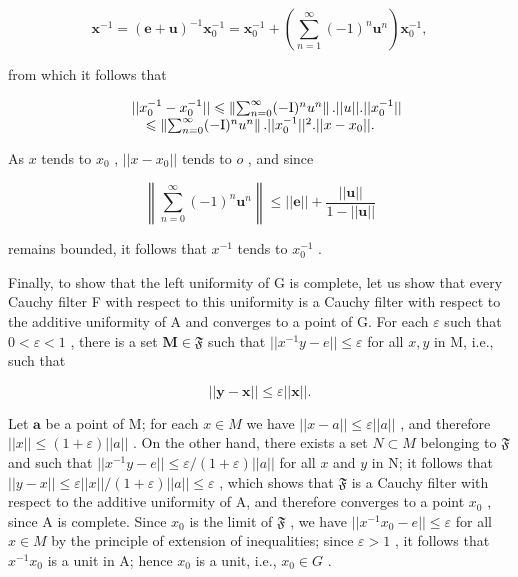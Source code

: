 \[
\boldsymbol {x} ^ {- 1} = (\boldsymbol {e} + \boldsymbol {u}) ^ {- 1} \boldsymbol {x} _ {0} ^ {- 1} = \boldsymbol {x} _ {0} ^ {- 1} + \left(\sum_ {n = 1} ^ {\infty} (- 1) ^ {n} \boldsymbol {u} ^ {n}\right) \boldsymbol {x} _ {0} ^ {- 1},\tag{9}
\]

from which it follows that

\[
\begin{array}{r l} & {| | x _ {0} ^ {- 1} - x _ {0} ^ {- 1} | | \leqslant \left\| \sum_ {n = 0} ^ {\infty} (- \mathrm{I}) ^ {n} u ^ {n} \right\|. | | u | |. | | x _ {0} ^ {- 1} | |} \\ & {\quad \leqslant \left\| \sum_ {n = 0} ^ {\infty} (- \mathrm{I}) ^ {n} u ^ {n} \right\|. | | x _ {0} ^ {- 1} | | ^ {2}. | | x - x _ {0} | |.} \end{array}
\]

As \(x\) tends to \(x_0\) , \(||x - x_0||\) tends to \(o\) , and since

\[
\left\| \sum_ {n = 0} ^ {\infty} (- 1) ^ {n} \boldsymbol {u} ^ {n} \right\| \leqslant | | \boldsymbol {e} | | + \frac {| | \boldsymbol {u} | |}{1 - | | \boldsymbol {u} | |}
\]

remains bounded, it follows that \(x^{-1}\) tends to \(x_{0}^{-1}\) .

Finally, to show that the left uniformity of G is complete, let us show that every Cauchy filter F with respect to this uniformity is a Cauchy filter with respect to the additive uniformity of A and converges to a point of G. For each \(\varepsilon\) such that \(0 < \varepsilon < 1\) , there is a set \(\mathbf{M} \in \mathfrak{F}\) such that \(||x^{-1}y - e|| \leqslant \varepsilon\) for all \(x, y\) in M, i.e., such that

\[
\left| \left| \mathbf {y} - \mathbf {x} \right| \right| \leqslant \varepsilon \left| \left| \mathbf {x} \right| \right|.
\]

Let \(\pmb{a}\) be a point of M; for each \(x \in M\) we have \(||x - a|| \leqslant \varepsilon ||a||\) , and therefore \(||x|| \leqslant (1 + \varepsilon)||a||\) . On the other hand, there exists a set \(N \subset M\) belonging to \(\mathfrak{F}\) and such that \(||x^{-1}y - e|| \leqslant \varepsilon / (1 + \varepsilon)||a||\) for all \(x\) and \(y\) in N; it follows that \(||y - x|| \leqslant \varepsilon ||x|| / (1 + \varepsilon)||a|| \leqslant \varepsilon\) , which shows that \(\mathfrak{F}\) is a Cauchy filter with respect to the additive uniformity of A, and therefore converges to a point \(x_0\) , since A is complete. Since \(x_0\) is the limit of \(\mathfrak{F}\) , we have \(||x^{-1}x_0 - e|| \leqslant \varepsilon\) for all \(x \in M\) by the principle of extension of inequalities; since \(\varepsilon > 1\) , it follows that \(x^{-1}x_0\) is a unit in A; hence \(x_0\) is a unit, i.e., \(x_0 \in G\) .

